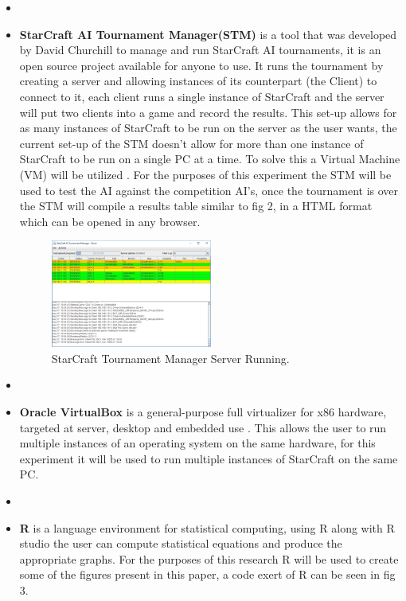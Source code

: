 \documentclass[journal]{IEEEtran}
\begin{document}
\begin{itemize}
	\item[]
	\item \textbf{StarCraft AI Tournament Manager(STM)} is a tool that was developed by David Churchill to manage and run StarCraft AI tournaments, it is an open source project available for anyone to use. It runs the tournament by creating a server and allowing instances of its counterpart (the Client) to connect to it, each client runs a single instance of StarCraft and the server will put two clients into a game and record the results. This set-up allows for as many instances of StarCraft to be run on the server as the user wants, the current set-up of the STM doesn't allow for more than one instance of StarCraft to be run on a single PC at a time. To solve this a Virtual Machine (VM) will be utilized \cite{Tournament}. For the purposes of this experiment the STM will be used to test the AI against the competition AI's, once the tournament is over the STM will compile  a results table similar to fig 2, in a HTML format which can be opened in any browser.
	\begin{figure}
		\centering
		\includegraphics[width=0.5\textwidth]{TMPic}
		\caption{StarCraft Tournament Manager Server Running.}
		\label{Fig2}
	\end{figure}
	\item[]
	\item \textbf{Oracle VirtualBox} is a general-purpose full virtualizer for x86 hardware, targeted at server, desktop and embedded use \cite{Virtual}. This allows the user to run multiple instances of an operating system on the same hardware, for this experiment it will be used to run multiple instances of StarCraft on the same PC. 
	\item[]
	\item \textbf{R} is a language environment for statistical computing, using R along with R studio the user can compute statistical equations and produce the appropriate graphs. For the purposes of this research R will be used to create some of the figures present in this paper, a code exert of R can be seen in fig 3. 
	\newline
\end{itemize}
\end{document}
